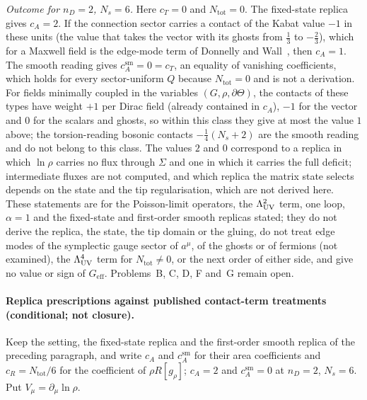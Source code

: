 \emph{Outcome for \(n_D=2\), \(N_s=6\).} Here \(c_T=0\) and \(N_{\mathrm{tot}}=0\). The fixed-state replica gives \(c_A=2\). If the connection sector carries a contact of the Kabat value \(-1\) in these units (the value that takes the vector with its ghosts from \(\tfrac13\) to \(-\tfrac23\)), which for a Maxwell field is the edge-mode term of Donnelly and Wall~\cite{DonnellyWall2016}, then \(c_A=1\). The smooth reading gives \(c_A^{\mathrm{sm}}=0=c_T\), an equality of vanishing coefficients, which holds for every sector-uniform \(Q\) because \(N_{\mathrm{tot}}=0\) and is not a derivation. For fields minimally coupled in the variables \((G,\rho,\partial\Theta)\), the contacts of these types have weight \(+1\) per Dirac field (already contained in \(c_A\)), \(-1\) for the vector and \(0\) for the scalars and ghosts, so within this class they give at most the value \(1\) above; the torsion-reading bosonic contacts \(-\tfrac14(N_s+2)\) are the smooth reading and do not belong to this class. The values \(2\) and \(0\) correspond to a replica in which \(\ln\rho\) carries no flux through \(\Sigma\) and one in which it carries the full deficit; intermediate fluxes are not computed, and which replica the matrix state selects depends on the state and the tip regularisation, which are not derived here. These statements are for the Poisson-limit operators, the \(\Lambda_{\mathrm{UV}}^2\) term, one loop, \(\alpha=1\) and the fixed-state and first-order smooth replicas stated; they do not derive the replica, the state, the tip domain or the gluing, do not treat edge modes of the symplectic gauge sector of \(a^\mu\), of the ghosts or of fermions (not examined), the \(\Lambda_{\mathrm{UV}}^4\) term for \(N_{\mathrm{tot}}\neq0\), or the next order of either side, and give no value or sign of \(G_{\mathrm{eff}}\). Problems~B, C, D, F and~G remain open.

\paragraph{Replica prescriptions against published contact-term treatments (conditional; not closure).}
Keep the setting, the fixed-state replica and the first-order smooth replica of the preceding paragraph, and write \(c_A\) and \(c_A^{\mathrm{sm}}\) for their area coefficients and \(c_R=N_{\mathrm{tot}}/6\) for the coefficient of \(\rho R[g_\rho]\); \(c_A=2\) and \(c_A^{\mathrm{sm}}=0\) at \(n_D=2\), \(N_s=6\). Put \(V_\mu=\partial_\mu\ln\rho\).

